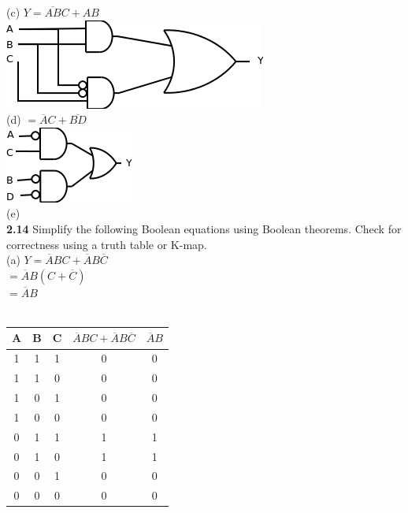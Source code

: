 \documentclass[12pt,a4paper]{report}
\newcommand*{\al}{\overline{A}}
\newcommand*{\cl}{\overline{C}}
\begin{document}
\begin{normalsize}
(c) $ Y = \overline{AB}C + AB $ \\
\includegraphics[scale=1]{2_8C} \\

(d) $ = \al{}C + \overline{BD} $ \\
\includegraphics[scale=1]{2_8D} \\

(e) \\

\textbf{2.14} Simplify the following Boolean equations using Boolean theorems. Check for correctness using a truth table or K-map. \\

(a) $ Y = \overline{A}BC + \overline{A}B\overline{C} $ \\
$ = \al{}B(C + \cl{}) $ \\
$ = \al{}B $ \\ \\
\begin{tabular}{|c|c|c|c|c|}
A & B & C & $ \al{}BC+\al{}B\cl{} $ & $ \al{}B $ \\ 
\hline 
1 & 1 & 1 & 0 & 0 \\ 
\hline 
1 & 1 & 0 & 0 & 0 \\ 
\hline 
1 & 0 & 1 & 0 & 0 \\ 
\hline 
1 & 0 & 0 & 0 & 0 \\ 
\hline 
0 & 1 & 1 & 1 & 1 \\ 
\hline 
0 & 1 & 0 & 1 & 1 \\ 
\hline 
0 & 0 & 1 & 0 & 0 \\ 
\hline 
0 & 0 & 0 & 0 & 0 \\ 
\hline 
\end{tabular} \\


\end{normalsize}
\end{document}
